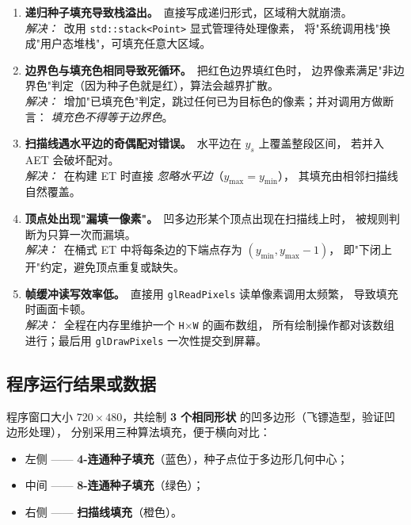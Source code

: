 \documentclass[a4paper,12pt]{ctexart}
\begin{document}
\begin{enumerate}[leftmargin=2em,itemsep=0.4em]
    \item \textbf{递归种子填充导致栈溢出。}\ 直接写成递归形式，区域稍大就崩溃。\\
        \textit{解决：}\ 改用 \texttt{std::stack<Point>} 显式管理待处理像素，
        将"系统调用栈"换成"用户态堆栈"，可填充任意大区域。

    \item \textbf{边界色与填充色相同导致死循环。}\ 把红色边界填红色时，
        边界像素满足"非边界色"判定（因为种子色就是红），算法会越界扩散。\\
        \textit{解决：}\ 增加"已填充色"判定，跳过任何已为目标色的像素；并对调用方做断言：
        \emph{填充色不得等于边界色}。

    \item \textbf{扫描线遇水平边的奇偶配对错误。}\ 水平边在 $y_s$ 上覆盖整段区间，
        若并入 AET 会破坏配对。\\
        \textit{解决：}\ 在构建 ET 时直接 \emph{忽略水平边}（$y_{\max}=y_{\min}$），
        其填充由相邻扫描线自然覆盖。

    \item \textbf{顶点处出现"漏填一像素"。}\ 凹多边形某个顶点出现在扫描线上时，
        被规则判断为只算一次而漏填。\\
        \textit{解决：}\ 在桶式 ET 中将每条边的下端点存为 $(y_{\min},y_{\max}-1)$，
        即"下闭上开"约定，避免顶点重复或缺失。

    \item \textbf{帧缓冲读写效率低。}\ 直接用 \texttt{glReadPixels} 读单像素调用太频繁，
        导致填充时画面卡顿。\\
        \textit{解决：}\ 全程在内存里维护一个 \texttt{H$\times$W} 的画布数组，
        所有绘制操作都对该数组进行；最后用 \texttt{glDrawPixels} 一次性提交到屏幕。
\end{enumerate}

\subsection{程序运行结果或数据}

程序窗口大小 $720\times 480$，共绘制 \textbf{3 个相同形状} 的凹多边形（飞镖造型，验证凹边形处理），
分别采用三种算法填充，便于横向对比：

\begin{itemize}[leftmargin=2em,itemsep=0.2em]
    \item 左侧 —— \textbf{4-连通种子填充}（蓝色），种子点位于多边形几何中心；
    \item 中间 —— \textbf{8-连通种子填充}（绿色）；
    \item 右侧 —— \textbf{扫描线填充}（橙色）。
\end{itemize}
\end{document}
